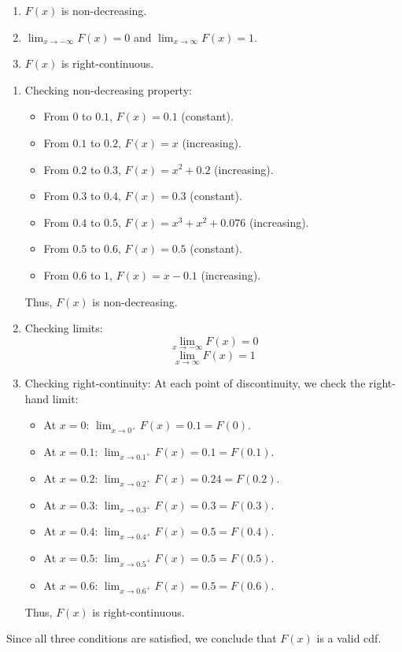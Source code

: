 \begin{enumerate}
\begin{enumerate}
    \item $F(x)$ is non-decreasing.
    \item $\lim_{x \to -\infty} F(x) = 0$ and $\lim_{x \to \infty} F(x) = 1$.
    \item $F(x)$ is right-continuous.
\end{enumerate}
\begin{enumerate}
    \item Checking non-decreasing property:
    \begin{itemize}
        \item From $0$ to $0.1$, $F(x) = 0.1$ (constant).
        \item From $0.1$ to $0.2$, $F(x) = x$ (increasing).
        \item From $0.2$ to $0.3$, $F(x) = x^2 + 0.2$ (increasing).
        \item From $0.3$ to $0.4$, $F(x) = 0.3$ (constant).
        \item From $0.4$ to $0.5$, $F(x) = x^3 + x^2 + 0.076$ (increasing).
        \item From $0.5$ to $0.6$, $F(x) = 0.5$ (constant).
        \item From $0.6$ to $1$, $F(x) = x - 0.1$ (increasing).
    \end{itemize}
    Thus, $F(x)$ is non-decreasing.
    
    \item Checking limits:
    \[\lim_{x \to -\infty} F(x) = 0\]
    \[\lim_{x \to \infty} F(x) = 1\]
    
    \item Checking right-continuity:
    At each point of discontinuity, we check the right-hand limit:
    \begin{itemize}
        \item At $x=0$: $\lim_{x \to 0^+} F(x) = 0.1 = F(0)$.
        \item At $x=0.1$: $\lim_{x \to 0.1^+} F(x) = 0.1 = F(0.1)$.
        \item At $x=0.2$: $\lim_{x \to 0.2^+} F(x) = 0.24 = F(0.2)$.
        \item At $x=0.3$: $\lim_{x \to 0.3^+} F(x) = 0.3 = F(0.3)$.
        \item At $x=0.4$: $\lim_{x \to 0.4^+} F(x) = 0.5 = F(0.4)$.
        \item At $x=0.5$: $\lim_{x \to 0.5^+} F(x) = 0.5 = F(0.5)$.
        \item At $x=0.6$: $\lim_{x \to 0.6^+} F(x) = 0.5 = F(0.6)$.
    \end{itemize}
    Thus, $F(x)$ is right-continuous.
\end{enumerate}
Since all three conditions are satisfied, we conclude that $F(x)$ is a valid cdf.
\end{enumerate}
